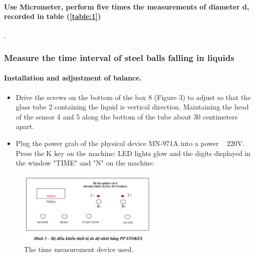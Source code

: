 \paragraph{Use Micrometer, perform five times the measurements of diameter d, recorded in table (\ref{table:1})}.

\subsubsection{Measure the time interval  of steel balls falling in liquids}
\paragraph{Installation and adjustment of balance.}
\begin{itemize}
    \item Drive the screws on the bottom of the box 8 (Figure 3) to adjust so that the glass tube 2 containing the liquid is vertical direction. Maintaining the head of the sensor 4 and 5 along the bottom of the tube about 30 centimeters apart.
    \item Plug the power grab of the physical device MN-971A into a power ~ 220V. Press the K key on the machine: LED lights glow and the digits displayed in the window "TIME" and "N" on the machine. 
\end{itemize}
\begin{figure}[H]
    \centering
    \captionsetup{justification=centering}
    \includegraphics[width=0.6\textwidth]{figures/machine-measure-viscosity.png}
    \caption{The time measurement device used.}
    \label{fig:measurement-device}
\end{figure}

